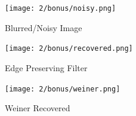 \documentclass{article}
\begin{document}
    \pagebreak
    \begin{figure}
        \texttt{[image: 2/bonus/noisy.png]}
        \caption{Blurred/Noisy Image}
        \label{fig:my_label}
    \end{figure}
    
    \pagebreak
    \begin{figure}
        \texttt{[image: 2/bonus/recovered.png]}
        \caption{Edge Preserving Filter}
        \label{fig:my_label}
    \end{figure}
    
    \pagebreak
    \begin{figure}
        \texttt{[image: 2/bonus/weiner.png]}
        \caption{Weiner Recovered}
        \label{fig:my_label}
    \end{figure}
    
\end{document}
